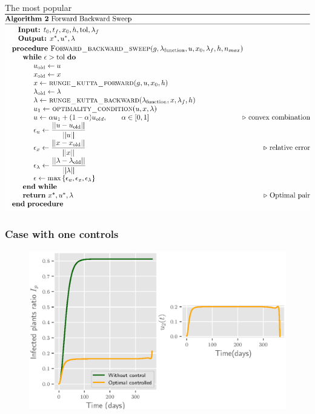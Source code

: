 	\begin{frame}{The most popular}
		\includegraphics[width=1\linewidth]{Feathergraphics/fbs_algorithm.pdf}
	\end{frame}
	
	\begin{frame}
		\frametitle{Case with one controls}
		\begin{figure}
			\centering	
			\includegraphics[scale=0.5]{Feathergraphics/only_infected_replanting.eps}
		\end{figure}	
	\end{frame}

